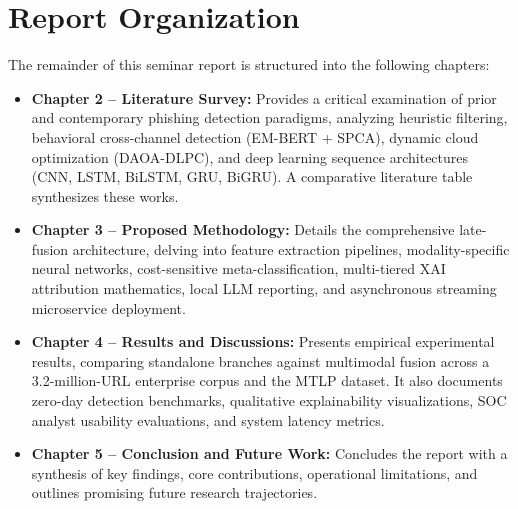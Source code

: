 \section{Report Organization}
The remainder of this seminar report is structured into the following chapters:
\begin{itemize}
\item \textbf{Chapter 2 -- Literature Survey:} Provides a critical examination of prior and contemporary phishing detection paradigms, analyzing heuristic filtering, behavioral cross-channel detection (EM-BERT + SPCA), dynamic cloud optimization (DAOA-DLPC), and deep learning sequence architectures (CNN, LSTM, BiLSTM, GRU, BiGRU). A comparative literature table synthesizes these works.
\item \textbf{Chapter 3 -- Proposed Methodology:} Details the comprehensive late-fusion architecture, delving into feature extraction pipelines, modality-specific neural networks, cost-sensitive meta-classification, multi-tiered XAI attribution mathematics, local LLM reporting, and asynchronous streaming microservice deployment.
\item \textbf{Chapter 4 -- Results and Discussions:} Presents empirical experimental results, comparing standalone branches against multimodal fusion across a 3.2-million-URL enterprise corpus and the MTLP dataset. It also documents zero-day detection benchmarks, qualitative explainability visualizations, SOC analyst usability evaluations, and system latency metrics.
\item \textbf{Chapter 5 -- Conclusion and Future Work:} Concludes the report with a synthesis of key findings, core contributions, operational limitations, and outlines promising future research trajectories.
\end{itemize}
